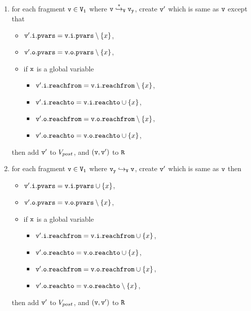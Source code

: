 \begin{itemize}
\begin{enumerate}
\item  for each fragment $\tt v \in V_1$ where $\tt v \overset{*}\hookrightarrow_{V} \mathtt{v}_y$, create $\tt v'$ which is same as $\tt v$ except that
\begin{itemize}
\item $\mathtt{v}'.\mathtt{i}.\mathtt{pvars} = \mathtt{v}.\mathtt{i}.\mathtt{pvars} \setminus \left\{x\right\}$,
\item $\mathtt{v}'.\mathtt{o}.\mathtt{pvars} = \mathtt{v}.\mathtt{o}.\mathtt{pvars} \setminus \left\{x\right\}$,
\item if $\tt x$ is a global variable
\begin{itemize}
\item $\mathtt{v}'.\mathtt{i}.\mathtt{reachfrom} = \mathtt{v}.\mathtt{i}.\mathtt{reachfrom} \setminus \left\{x\right\}$,
\item $\mathtt{v}'.\mathtt{i}.\mathtt{reachto} = \mathtt{v}.\mathtt{i}.\mathtt{reachto} \cup \left\{x\right\}$,
\item $\mathtt{v}'.\mathtt{o}.\mathtt{reachfrom} = \mathtt{v}.\mathtt{o}.\mathtt{reachfrom} \setminus \left\{x\right\}$,
\item $\mathtt{v}'.\mathtt{o}.\mathtt{reachto} = \mathtt{v}.\mathtt{o}.\mathtt{reachto} \cup \left\{x\right\}$,
\end{itemize}
\end{itemize}
then add $\tt v'$ to $V_{post}$, and $\tt (v,v')$ to $\tt R$
\item for each fragment $\tt v \in V_1$ where $\tt \mathtt{v}_y \hookrightarrow_{V} v$, create $\tt v'$ which is same as $\tt v$ then
\begin{itemize}
\item $\mathtt{v}'.\mathtt{i}.\mathtt{pvars} = \mathtt{v}.\mathtt{i}.\mathtt{pvars} \cup \left\{x\right\}$,
\item $\mathtt{v}'.\mathtt{o}.\mathtt{pvars} = \mathtt{v}.\mathtt{o}.\mathtt{pvars} \setminus \left\{x\right\}$,
\item if $\tt x$ is a global variable
\begin{itemize}
\item $\mathtt{v}'.\mathtt{i}.\mathtt{reachfrom} = \mathtt{v}.\mathtt{i}.\mathtt{reachfrom} \cup \left\{x\right\}$,
 \item $\mathtt{v}'.\mathtt{o}.\mathtt{reachto} = \mathtt{v}.\mathtt{o}.\mathtt{reachto} \cup \left\{x\right\}$,
 \item $\mathtt{v}'.\mathtt{o}.\mathtt{reachfrom} = \mathtt{v}.\mathtt{o}.\mathtt{reachfrom} \cup \left\{x\right\}$,
 \item $\mathtt{v}'.\mathtt{o}.\mathtt{reachto} = \mathtt{v}.\mathtt{o}.\mathtt{reachto} \setminus \left\{x\right\}$,
\end{itemize}
\end{itemize}
then add $\tt v'$ to $V_{post}$, and $\tt (v,v')$ to $\tt R$

\end{enumerate}
\end{itemize}
